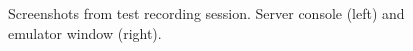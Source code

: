 
\begin{figure}[t]%
\begin{center}
\end{center}
\caption{Screenshots from test recording session. Server console (left) and emulator window (right).}%
\label{fig:session}
\end{figure}
